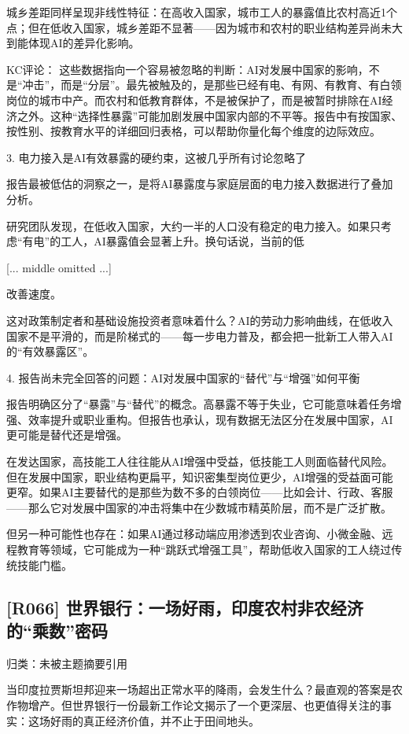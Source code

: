 \documentclass[11pt]{ctexart}
\begin{document}
城乡差距同样呈现非线性特征：在高收入国家，城市工人的暴露值比农村高近1个点；但在低收入国家，城乡差距不显著——因为城市和农村的职业结构差异尚未大到能体现AI的差异化影响。

KC评论： 这些数据指向一个容易被忽略的判断：AI对发展中国家的影响，不是“冲击”，而是“分层”。最先被触及的，是那些已经有电、有网、有教育、有白领岗位的城市中产。而农村和低教育群体，不是被保护了，而是被暂时排除在AI经济之外。这种“选择性暴露”可能加剧发展中国家内部的不平等。报告中有按国家、按性别、按教育水平的详细回归表格，可以帮助你量化每个维度的边际效应。

3. 电力接入是AI有效暴露的硬约束，这被几乎所有讨论忽略了

报告最被低估的洞察之一，是将AI暴露度与家庭层面的电力接入数据进行了叠加分析。

研究团队发现，在低收入国家，大约一半的人口没有稳定的电力接入。如果只考虑“有电”的工人，AI暴露值会显著上升。换句话说，当前的低

[... middle omitted ...]

改善速度。

这对政策制定者和基础设施投资者意味着什么？AI的劳动力影响曲线，在低收入国家不是平滑的，而是阶梯式的——每一步电力普及，都会把一批新工人带入AI的“有效暴露区”。

4. 报告尚未完全回答的问题：AI对发展中国家的“替代”与“增强”如何平衡

报告明确区分了“暴露”与“替代”的概念。高暴露不等于失业，它可能意味着任务增强、效率提升或职业重构。但报告也承认，现有数据无法区分在发展中国家，AI更可能是替代还是增强。

在发达国家，高技能工人往往能从AI增强中受益，低技能工人则面临替代风险。但在发展中国家，职业结构更扁平，知识密集型岗位更少，AI增强的受益面可能更窄。如果AI主要替代的是那些为数不多的白领岗位——比如会计、行政、客服——那么它对发展中国家的冲击将集中在少数城市精英阶层，而不是广泛扩散。

但另一种可能性也存在：如果AI通过移动端应用渗透到农业咨询、小微金融、远程教育等领域，它可能成为一种“跳跃式增强工具”，帮助低收入国家的工人绕过传统技能门槛。

\subsection{[R066] 世界银行：一场好雨，印度农村非农经济的“乘数”密码}
{\small\color{refgray}归类：未被主题摘要引用}

当印度拉贾斯坦邦迎来一场超出正常水平的降雨，会发生什么？最直观的答案是农作物增产。但世界银行一份最新工作论文揭示了一个更深层、也更值得关注的事实：这场好雨的真正经济价值，并不止于田间地头。
\end{document}
